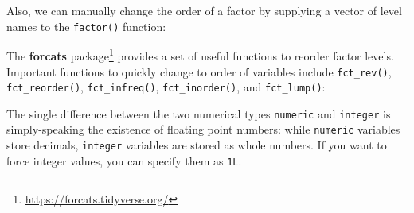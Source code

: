 \documentclass[
]{krantz}
\makeatletter
\newenvironment{Shaded}{\begin{snugshade}}{\end{snugshade}}
\newcommand{\AttributeTok}[1]{\textcolor[rgb]{0.61,0.61,0.61}{#1}}
\newcommand{\DocumentationTok}[1]{\textcolor[rgb]{0.37,0.37,0.37}{\textbf{\textit{#1}}}}
\newcommand{\FunctionTok}[1]{\textcolor[rgb]{0,0,0}{#1}}
\newcommand{\NormalTok}[1]{#1}
\newcommand{\OtherTok}[1]{\textcolor[rgb]{0.37,0.37,0.37}{#1}}
\newcommand{\SpecialCharTok}[1]{\textcolor[rgb]{0,0,0}{#1}}
\newcommand{\StringTok}[1]{\textcolor[rgb]{0.5,0.5,0.5}{#1}}
\renewcommand{\href}[2]{#2\footnote{\url{#1}}}
\newenvironment{kframe}{%
\medskip{}
\setlength{\fboxsep}{.8em}
 \def\at@end@of@kframe{}%
 \ifinner\ifhmode%
  \def\at@end@of@kframe{\end{minipage}}%
  \begin{minipage}{\columnwidth}%
 \fi\fi%
 \def\FrameCommand##1{\hskip\@totalleftmargin \hskip-\fboxsep
 \colorbox{shadecolor}{##1}\hskip-\fboxsep
     \hskip-\linewidth \hskip-\@totalleftmargin \hskip\columnwidth}%
 \MakeFramed {\advance\hsize-\width
   \@totalleftmargin\z@ \linewidth\hsize
   \@setminipage}}%
 {\par\unskip\endMakeFramed%
 \at@end@of@kframe}
\renewenvironment{Shaded}{\begin{kframe}}{\end{kframe}}
\makeatother
\begin{document}
Also, we can manually change the order of a factor by supplying a vector of level names to the \texttt{factor()} function:

\begin{Shaded}
\end{Shaded}

The \href{https://forcats.tidyverse.org/}{\textbf{forcats} package} \citep{forcats} provides a set of useful functions to reorder factor levels. Important functions to quickly change to order of variables include \texttt{fct\_rev()}, \texttt{fct\_reorder()}, \texttt{fct\_infreq()}, \texttt{fct\_inorder()}, and \texttt{fct\_lump()}:

\begin{Shaded}
\end{Shaded}

The single difference between the two numerical types \texttt{numeric} and \texttt{integer} is simply-speaking the existence of floating point numbers: while \texttt{numeric} variables store decimals, \texttt{integer} variables are stored as whole numbers. If you want to force integer values, you can specify them as \texttt{1L}.
\end{document}
